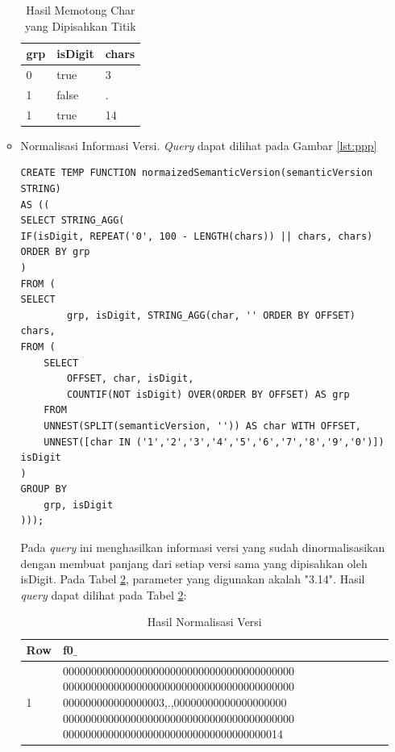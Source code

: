 \begin{enumerate}
\begin{itemize}
			\begin{table}[H]
			\centering
			\begin{tabular}{|l|l|l|}
				\hline
				\textbf{grp} & \textbf{isDigit} & \textbf{chars}\\
				\hline
				0 & true & 3\\
				\hline
				1 & false & .\\
				\hline
				1 & true & 14\\
				\hline
			\end{tabular}
						\caption{Hasil Memotong Char yang Dipisahkan Titik}
			\label{table:compare_version_step_2}
		\end{table}
		
		\item Normalisasi Informasi Versi. \textit{Query} dapat dilihat pada Gambar \ref{lst:ppp}
		\begin{lstlisting}[label={lst:ppp}, caption={Normalisasi Informasi Versi}]
CREATE TEMP FUNCTION normaizedSemanticVersion(semanticVersion STRING) 
AS ((
SELECT STRING_AGG(
IF(isDigit, REPEAT('0', 100 - LENGTH(chars)) || chars, chars) ORDER BY grp 
)
FROM (
SELECT 
		grp, isDigit, STRING_AGG(char, '' ORDER BY OFFSET) chars,
FROM (
	SELECT 
		OFFSET, char, isDigit,
		COUNTIF(NOT isDigit) OVER(ORDER BY OFFSET) AS grp
	FROM 
	UNNEST(SPLIT(semanticVersion, '')) AS char WITH OFFSET, 
	UNNEST([char IN ('1','2','3','4','5','6','7','8','9','0')]) isDigit
)
GROUP BY 
	grp, isDigit
)));
		\end{lstlisting}
		Pada \textit{query} ini menghasilkan informasi versi yang sudah dinormalisasikan dengan membuat panjang dari setiap versi sama yang dipisahkan oleh isDigit. Pada Tabel \ref{table:compare_version_step_3}, parameter yang digunakan akalah "3.14". Hasil \textit{query} dapat dilihat pada Tabel \ref{table:compare_version_step_3}:
		\begin{table}[H]
			\centering
			\begin{tabular}{|l|p{8cm}|}
				\hline
				\textbf{Row} & \textbf{f0$\_$}\\
				\hline
				1 & 00000000000000000000000000000000000000000 00000000000000000000000000000000000000000 000000000000000003,.,00000000000000000000 00000000000000000000000000000000000000000 000000000000000000000000000000000000014\\
				\hline
			\end{tabular}
						\caption{Hasil Normalisasi Versi}
			\label{table:compare_version_step_3}
		\end{table}
	\end{itemize}


\end{enumerate}
